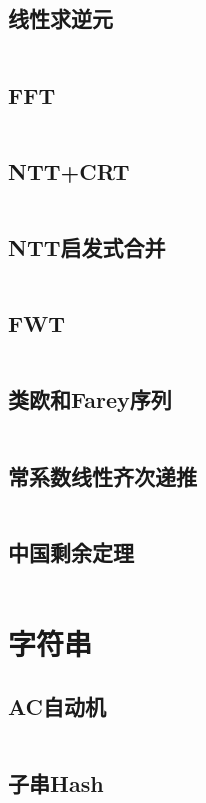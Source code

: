 \documentclass[UTF8]{ctexart}
\begin{document}
\subsection{线性求逆元}
\inputminted{cpp}{math/线性求逆元.cpp}

\subsection{FFT}
\inputminted{cpp}{math/FFT.cpp}

\subsection{NTT+CRT}
\inputminted{cpp}{math/NTT+CRT.cpp}

\subsection{NTT启发式合并}
\inputminted{cpp}{math/NTT启发式合并.cpp}

\subsection{FWT}
\inputminted{cpp}{math/FWT.cpp}

\subsection{类欧和Farey序列}
\inputminted{cpp}{math/类欧和Farey序列.cpp}

\subsection{常系数线性齐次递推}
\inputminted{cpp}{math/常系数线性齐次递推.cpp}

\subsection{中国剩余定理}
\inputminted{cpp}{math/中国剩余定理.cpp}

\section{字符串}

\subsection{AC自动机}
\inputminted{cpp}{string/AC自动机.cpp}

\subsection{子串Hash}
\inputminted{cpp}{string/Hash.cpp}
\end{document}
